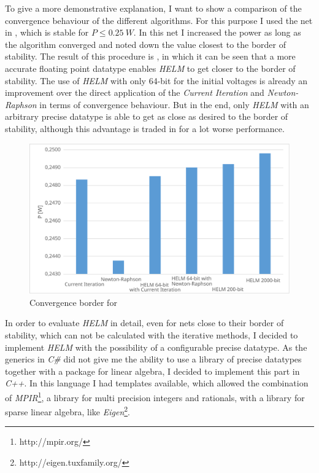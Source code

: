 To give a more demonstrative explanation, I want to show a comparison of the convergence behaviour of the different algorithms. For this purpose I used the net in , which is stable for $P \le \SI{0.25}{W}$. In this net I increased the power as long as the algorithm converged and noted down the value closest to the border of stability. The result of this procedure is , in which it can be seen that a more accurate floating point datatype enables \emph{HELM} to get closer to the border of stability. The use of \emph{HELM} with only 64-bit for the initial voltages is already an improvement over the direct application of the \emph{Current Iteration} and \emph{Newton-Raphson} in terms of convergence behaviour. But in the end, only \emph{HELM} with an arbitrary precise datatype is able to get as close as desired to the border of stability, although this advantage is traded in for a lot worse performance.

\begin{figure}
	\centering
	\includegraphics[scale=0.7]{figures/convergence_border}
	\caption{Convergence border for }
	\label{fig:convergence_border}
\end{figure}

In order to evaluate \emph{HELM} in detail, even for nets close to their border of stability, which can not be calculated with the iterative methods, I decided to implement \emph{HELM} with the possibility of a configurable precise datatype. As the generics in \emph{C\#} did not give me the ability to use a library of precise datatypes together with a package for linear algebra, I decided to implement this part in \emph{C++}. In this language I had templates available, which allowed the combination of \emph{MPIR}\footnote{http://mpir.org/}, a library for multi precision integers and rationals, with a library for sparse linear algebra, like \emph{Eigen}\footnote{http://eigen.tuxfamily.org/}.

